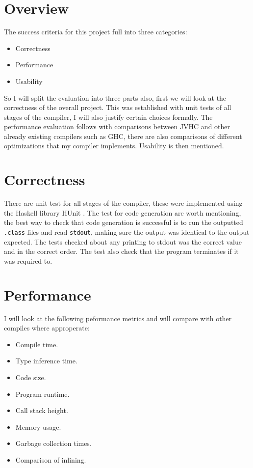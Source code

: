 \documentclass[float=false, crop=false]{standalone}
\begin{document}
\section{Overview}

The success criteria for this project full into three categories:
\begin{itemize}
  \item Correctness
  \item Performance
  \item Usability 
\end{itemize}

So I will split the evaluation into three parts also, first we will
look at the correctness of the overall project. This was established 
with unit tests of all stages of the compiler, I will
also justify certain choices formally. The performance evaluation follows 
with comparisons between JVHC and other already existing compilers such as
GHC, there are also comparisons of different optimizations that my compiler
implements. Usability is then mentioned.

\section{Correctness}

There are unit test for all stages of the compiler, these were implemented 
using the Haskell library HUnit \cite{hunit-lib}. The test for code generation
are worth mentioning, the best way to check that code generation is 
successful is to run the outputted \texttt{.class} files and read 
\texttt{stdout}, making sure the output was identical to the output
expected. The tests checked about any printing to stdout was the correct
value and in the correct order. The test also check that the program 
terminates if it was required to.

\section{Performance}

I will look at the following peformance metrics and will compare with other compiles where
approperate:

\begin{itemize}
  \item Compile time.
  \item Type inference time.
  \item Code size.
  \item Program runtime.
  \item Call stack height.
  \item Memory usage.
  \item Garbage collection times.
  \item Comparison of inlining.
\end{itemize}
\end{document}
